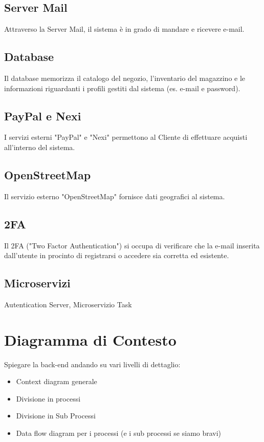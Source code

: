 \documentclass{report}
\begin{document}
\subsection*{Server Mail}
Attraverso la Server Mail, il sistema è in grado di mandare e ricevere e-mail. 

\subsection*{Database}
Il database memorizza il catalogo del negozio, l'inventario del magazzino e le informazioni riguardanti i profili gestiti dal sistema (es. e-mail e password).

\subsection*{PayPal e Nexi}
I servizi esterni "PayPal" e "Nexi" permettono al Cliente di effettuare acquisti all'interno del sistema.

\subsection*{OpenStreetMap}
Il servizio esterno "OpenStreetMap" fornisce dati geografici al sistema.%

\subsection*{2FA}
Il 2FA ("Two Factor Authentication") si occupa di verificare che la e-mail inserita dall'utente in procinto di registrarsi o accedere sia corretta ed esistente.

\subsection*{Microservizi}
Autentication Server, Microservizio Task


\section{Diagramma di Contesto}

Spiegare la back-end andando su vari livelli di dettaglio:
\begin{itemize}
	\item Context diagram generale
	\item Divisione in processi
	\item Divisione in Sub Processi
	\item Data flow diagram per i processi (e i sub processi se siamo bravi)
\end{itemize}
\end{document}

